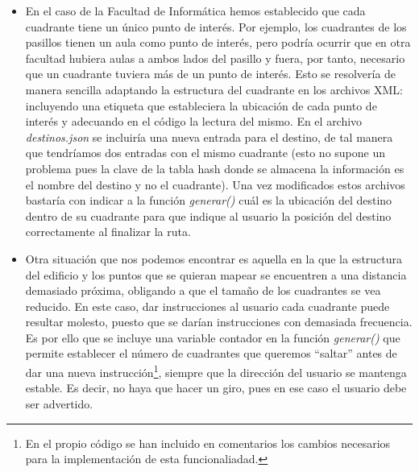 \begin{itemize}

	\item En el caso de la Facultad de Informática hemos establecido que cada cuadrante tiene un único punto de interés. Por ejemplo, los cuadrantes de los pasillos tienen un aula como punto de interés, pero podría ocurrir que en otra facultad hubiera aulas a ambos lados del pasillo y fuera, por tanto, necesario que un cuadrante tuviera más de un punto de interés. Esto se resolvería de manera sencilla adaptando la estructura del cuadrante en los archivos XML: incluyendo una etiqueta que estableciera la ubicación de cada punto de interés y adecuando en el código la lectura del mismo. En el archivo \textit{destinos.json} se incluiría una nueva entrada para el destino, de tal manera que tendríamos dos entradas con el mismo cuadrante (esto no supone un problema pues la clave de la tabla hash donde se almacena la información es el nombre del destino y no el cuadrante). Una vez modificados estos archivos bastaría con indicar a la función \textit{generar()} cuál es la ubicación del destino dentro de su cuadrante para que indique al usuario la posición del destino correctamente al finalizar la ruta.
	
	\item Otra situación que nos podemos encontrar es aquella en la que la estructura del edificio y los puntos que se quieran mapear se encuentren a una distancia demasiado próxima, obligando a que el tamaño de los cuadrantes se vea reducido. En este caso, dar instrucciones al usuario cada cuadrante puede resultar molesto, puesto que se darían instrucciones con demasiada frecuencia. Es por ello que se incluye una variable contador en la función \textit{generar()} que permite establecer el número de cuadrantes que queremos ``saltar'' antes de dar una nueva instrucción\footnote{En el propio código se han incluido en comentarios los cambios necesarios para la implementación de esta funcionaliadad.}, siempre que la dirección del usuario se mantenga estable. Es decir, no haya que hacer un giro, pues en ese caso el usuario debe ser advertido. 

\end{itemize}